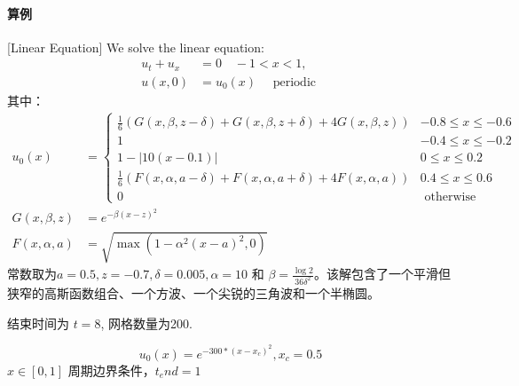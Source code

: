 \documentclass{book}
\begin{document}
\paragraph{算例}
\begin{example}{}{}
    [Linear Equation]
    We solve the linear equation\cite{RN56}:
    \begin{equation}
        \begin{aligned}
            u_{t}+u_{x} & =0 \quad-1<x<1,                    \\
            u(x, 0)     & =u_{0}(x) \quad \text { periodic }
        \end{aligned}
    \end{equation}
    其中：
    \begin{equation}
        \begin{aligned}
            u_{0}(x)        & =\begin{cases}
                                   \frac{1}{6}(G(x, \beta, z-\delta)+G(x, \beta, z+\delta)+4 G(x, \beta, z))    & -0.8 \leq x \leq-0.6 \\
                                   1                                                                            & -0.4 \leq x \leq-0.2 \\
                                   1-|10(x-0.1)|                                                                & 0 \leq x \leq 0.2    \\
                                   \frac{1}{6}(F(x, \alpha, a-\delta)+F(x, \alpha, a+\delta)+4 F(x, \alpha, a)) & 0.4 \leq x \leq 0.6  \\
                                   0                                                                            & \text { otherwise }
                               \end{cases} \\
            G(x, \beta, z)  & =e^{-\beta(x-z)^{2}}                                                                                 \\
            F(x, \alpha, a) & =\sqrt{\max \left(1-\alpha^{2}(x-a)^{2}, 0\right)}
        \end{aligned}
    \end{equation}
    常数取为$a=0.5, z=-0.7, \delta=0.005, \alpha=10$ 和 $\beta=\frac{\log 2}{36 \delta^{2}}$。该解包含了一个平滑但狭窄的高斯函数组合、一个方波、一个尖锐的三角波和一个半椭圆。

    结束时间为 $t=8$, 网格数量为200.
\end{example}
\begin{example}{}{}
    \cite{RN204}
    \begin{equation}
        u_0(x) = e^{-300*(x-x_c)^2},x_c=0.5
    \end{equation}
    $x\in[0,1]$ 周期边界条件，$t_end=1$

\end{example}
\end{document}
